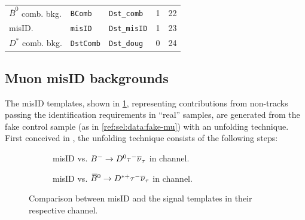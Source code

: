 \begin{table}[!htb]
\begin{tabular}{lllrr}
 $\overline{B}^0$ comb. bkg.                                                       & \texttt{BComb}                    & \texttt{Dst\_comb}         &                     1 &               22 \\
 misID.                                                                            & \texttt{misID}                    & \texttt{Dst\_misID}        &                     1 &               23 \\
 $D^*$ comb. bkg.                                                                  & \texttt{DstComb}                  & \texttt{Dst\_doug}         &                     0 &               24 \\
\bottomrule
\end{tabular}

\end{table}


\subsection{Muon misID backgrounds}
\label{ref:fit:tmpl:misid}

The \muon misID templates,
shown in \cref{fig:misid-vs-sig},
representing contributions from non-\muon tracks passing the \muon
identification requirements in ``real'' \muon samples,
are generated from the fake \muon control sample
(as in \cref{ref:sel:data:fake-mu}) with an unfolding technique.
First conceived in \cite{LHCb-ANA-2016-059}, the unfolding technique
consists of the following steps:

\begin{figure}[!htb]
    \centering
    \begin{subfigure}{0.9\textwidth}
        \centering
        \caption{
            \muon misID vs. ${{{B}^-}} \rightarrow {\ensuremath{{D}^0}}{\ensuremath{\tau^-}}{\ensuremath{{\overline{\nu}}_\tau}}$ in \Dz channel.
        }
    \end{subfigure}

    \begin{subfigure}{0.9\textwidth}
        \centering
        \caption{
            \muon misID vs. ${{\kern 0.18em\overline{\kern -0.18em B}}{}^0} \rightarrow {\ensuremath{{D}^{*+}}}{\ensuremath{\tau^-}}{\ensuremath{{\overline{\nu}}_\tau}}$ in \Dstar channel.
        }
    \end{subfigure}

    \caption{
        Comparison between misID and the signal templates in their
        respective channel.
    }
    \label{fig:misid-vs-sig}
\end{figure}

